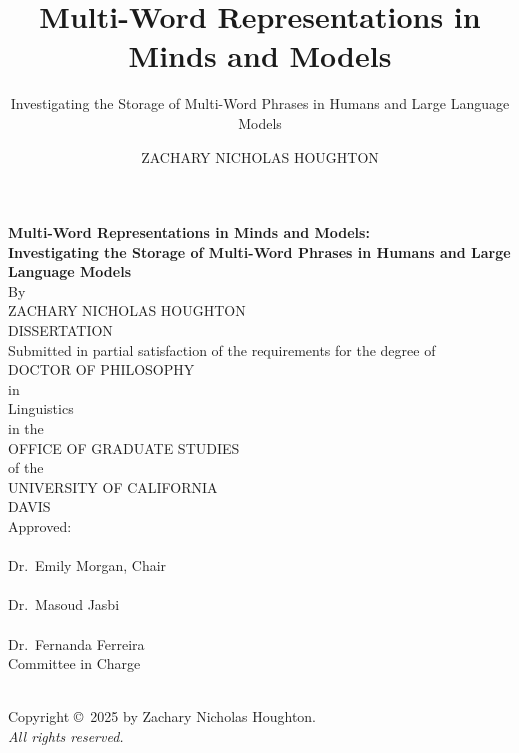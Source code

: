 \documentclass[
  12pt,
  letterpaper,
]{scrreport}
\title{Multi-Word Representations in Minds and Models}
\subtitle{Investigating the Storage of Multi-Word Phrases in Humans and
Large Language Models}
\author{ZACHARY NICHOLAS HOUGHTON}
\date{}
\begin{document}
\cleardoublepage
\thispagestyle{plain}
\begin{center}
   \null\vfill
   \textbf{%
      Multi-Word Representations in Minds and Models:\\
	  Investigating the Storage of Multi-Word Phrases in Humans and Large
  Language Models
   }%
   \\
   \bigskip
   By \\
   \bigskip
   {ZACHARY NICHOLAS HOUGHTON}
\\   
   DISSERTATION \\
   \bigskip
   Submitted in partial satisfaction of the requirements for the
   degree of \\
   \bigskip
   DOCTOR OF PHILOSOPHY \\
   \bigskip
   in \\
   \bigskip
   {Linguistics} \\ 
      \bigskip
   in the \\
   \bigskip
   OFFICE OF GRADUATE STUDIES \\
   \bigskip        
   of the \\
   \bigskip
   UNIVERSITY OF CALIFORNIA \\
   \bigskip
   DAVIS \\
   \bigskip
   Approved: \\
   \bigskip
   \bigskip
   \makebox[3in]{\hrulefill} \\
   Dr.~Emily Morgan, Chair \\
   \bigskip
   \bigskip
   \makebox[3in]{\hrulefill} \\
   Dr.~Masoud Jasbi \\
   \bigskip
   \bigskip
   \makebox[3in]{\hrulefill} \\
   Dr.~Fernanda Ferreira \\
   \bigskip
   Committee in Charge \\
    \\
   \vfill
\end{center}


\newpage
{}
\setcounter{savedpage}{\value{page}}

\thispagestyle{empty}
\begin{titlepage}
\begin{center}
  Copyright \copyright\ 2025 by Zachary Nicholas Houghton. \\
  \textit{All rights reserved.}
\end{center}
\end{titlepage}
\end{document}
